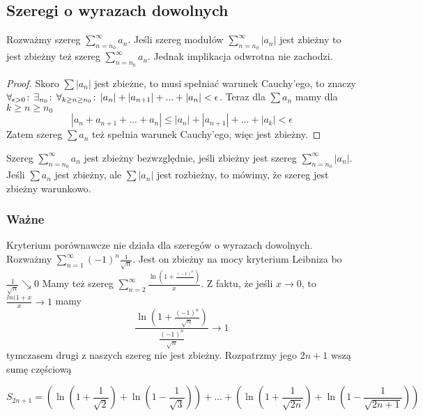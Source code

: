 \documentclass[9pt]{article}
\begin{document}
\subsection{Szeregi o wyrazach dowolnych}

\begin{Twi}
    Rozważmy szereg $\sum_{n = n_0}^{\infty} a_n$. Jeśli szereg modułów
    $\sum_{n = n_0}^{\infty} |a_n|$ jest zbieżny to jest zbieżny też szereg
    $\sum_{n = n_0}^{\infty} a_n$. Jednak implikacja odwrotna nie zachodzi.
\end{Twi}

\begin{proof}
    Skoro $\sum |a_n|$ jest zbieżne, to musi spełniać warunek Cauchy'ego, to znaczy
    $\forall_{\epsilon > 0} \! : \, \exists_{n_0} \! : \, \forall_{k \ge n \ge n_0} \! : \, |a_n| + |a_{n+1}| + ... + |a_n| < \epsilon$.
    Teraz dla $\sum a_n$ mamy dla $k \ge n \ge n_0$
    \[
        \left|
        a_n + a_{n+1} + ... + a_n
        \right|
        \le
        \left|a_n\right| + 
        \left|a_{n+1}\right| +  ... +
        \left|a_k\right|
        < \epsilon
    \]
    Zatem szereg $\sum a_n$ też spełnia warunek Cauchy'ego, więc jest zbieżny.
\end{proof}

\begin{Def}
    Szereg $\sum_{n = n_0}^{\infty} a_n$ jest zbieżny bezwzględnie, jeśli zbieżny jest szereg
    $\sum_{n = n_0}^{\infty} |a_n|$. Jeśli $\sum a_n$ jest zbieżny, ale $\sum |a_n|$ jest rozbieżny,
    to mówimy, że szereg jest zbieżny warunkowo.
\end{Def}

\subsubsection*{Ważne}

Kryterium porównawcze nie działa dla szeregów o wyrazach dowolnych.
Rozważmy
$\sum_{n = 1}^{\infty} (-1)^n \frac{1}{\sqrt{n}}$.
Jest on zbieżny na mocy kryterium Leibniza bo $\frac{1}{\sqrt{n}} \searrow 0$
Mamy też szereg $\sum_{n = 2}^{\infty} \frac{\ln(1+\frac{(-1)^n}{})}{x}$. Z faktu, że jeśli
$x \to 0$, to $\frac{ln(1+x}{x} \to 1$ mamy
\[
    \frac{\ln(1+\frac{(-1)^n}{\sqrt{n}})}{\frac{(-1)^n}{\sqrt{n}}} \to 1
\]
tymczasem drugi z naszych szereg nie jest zbieżny.
Rozpatrzmy jego $2n+1$ wszą sumę częściową

\[
    S_{2n+1} =
    \left(
        \ln\left(1+\frac{1}{\sqrt{2}}\right) +
        \ln\left(1-\frac{1}{\sqrt{3}}\right)
    \right) + ... +
    \left(
        \ln\left(1+\frac{1}{\sqrt{2n}}\right) +
        \ln\left(1-\frac{1}{\sqrt{2n+1}}\right)
    \right)
\]
\end{document}
